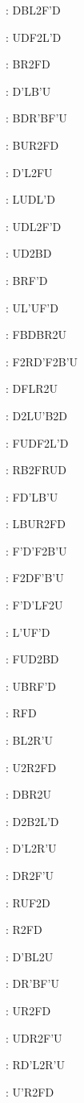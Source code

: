 \documentclass[9pt]{article}
\begin{document}
{\begin{multicols}{6}
: DBL2F'D

: UDF2L'D

: BR2FD

: D'LB'U

: BDR'BF'U

: BUR2FD

: D'L2FU

: LUDL'D

: UDL2F'D

: UD2BD

: BRF'D

: UL'UF'D

: FBDBR2U

: F2RD'F2B'U

: DFLR2U

: D2LU'B2D

: FUDF2L'D

: RB2FRUD

: FD'LB'U

: LBUR2FD

: F'D'F2B'U

: F2DF'B'U

: F'D'LF2U

: L'UF'D

: FUD2BD

: UBRF'D

: RFD

: BL2R'U

: U2R2FD

: DBR2U

: D2B2L'D

: D'L2R'U

: DR2F'U

: RUF2D

: R2FD

: D'BL2U

: DR'BF'U

: UR2FD

: UDR2F'U

: RD'L2R'U

: U'R2FD


\end{multicols}}
\end{document}
